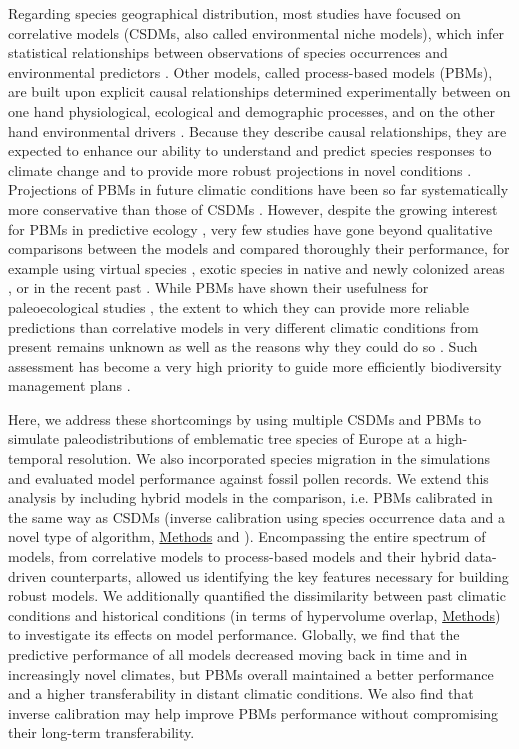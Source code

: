 \documentclass[pdflatex, sn-nature]{sn-jnl}%
\begin{document}
Regarding species geographical distribution, most studies have focused on correlative models (CSDMs, also called environmental niche models), which infer statistical relationships between observations of species occurrences and environmental predictors \cite{Dormann2012}.  Other models, called process-based models (PBMs), are built upon explicit causal relationships determined experimentally between on one hand physiological, ecological and demographic processes, and on the other hand environmental drivers \cite{Dormann2012}. Because they describe causal relationships, they are expected to enhance our ability to understand and predict species responses to climate change and to provide more robust projections in novel conditions \cite{Evans2012, Singer2016}. Projections of PBMs in future climatic conditions have been so far systematically more conservative than those of CSDMs \cite{Morin2009, Cheaib2012, Gritti2013}. However, despite the growing interest for PBMs in predictive ecology \cite{Connolly2017, Urban2016, Pilowsky2022}, very few studies have gone beyond qualitative comparisons between the models and compared thoroughly their performance, for example using virtual species \cite{Zurell2016}, exotic species in native and newly colonized areas \cite{Higgins2020}, or in the recent past \cite{Fordham2018}. While PBMs have shown their usefulness for paleoecological studies \cite{Saltre2013, Ruosch2016, Schwoerer2014}, the extent to which they can provide more reliable predictions than correlative models in very different climatic conditions from present remains unknown as well as the reasons why they could do so \cite{UribeRivera2022, Briscoe2019}. Such assessment has become a very high priority to guide more efficiently biodiversity management plans \cite{Pacifici2015}.

Here, we address these shortcomings by using multiple CSDMs and PBMs to simulate paleodistributions of emblematic tree species of Europe at a high-temporal resolution. We also incorporated species migration in the simulations and evaluated model performance against fossil pollen records. We extend this analysis by including hybrid models in the comparison, i.e. PBMs calibrated in the same way as CSDMs (inverse calibration using species occurrence data and a novel type of algorithm, \hyperref[methods]{Methods} and \citep{VanderMeersch2023}). Encompassing the entire spectrum of models, from correlative models to process-based models and their hybrid data-driven counterparts, allowed us identifying the key features necessary for building robust models. We additionally quantified the dissimilarity between past climatic conditions and historical conditions (in terms of hypervolume overlap, \hyperref[methods]{Methods}) to investigate its effects on model performance.
Globally, we find that the predictive performance of all models decreased moving back in time and in increasingly novel climates, but PBMs overall maintained a better performance and a higher transferability in distant climatic conditions. We also find that inverse calibration may help improve PBMs performance without compromising their long-term transferability.
\end{document}
